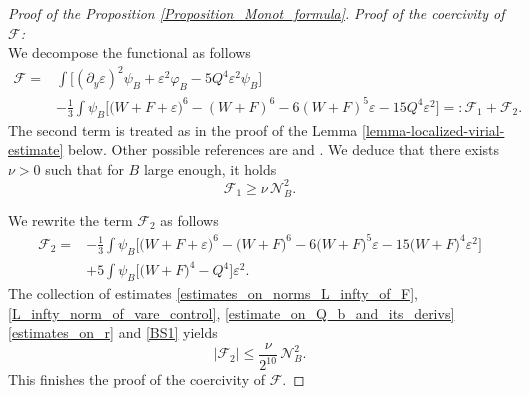 \documentclass[16pt,english, oneside,reqno]{smfart}
\newcommand{\vare}{{\varepsilon}}
\newcommand{\vphi}{{\varphi}}
\begin{document}
\begin{proof}[Proof of the Proposition \ref{Proposition_Monot_formula}]
\vspace{0.4cm}
\textit{Proof of the coercivity of $\mathcal{F}$:}\\
We decompose the functional as follows
\begin{equation}
    \begin{split}
        \mathcal{F} = 
        & \int \Big[ (\partial_y \vare)^2\psi_B +\vare^2 \vphi_B - 5Q^4 \vare^2\psi_B \Big]\\
        &-\frac{1}{3}\int \psi_B \Big[\big( W+F+\vare \big)^6 - (W+F)^6 - 6(W+F)^5\vare - 15Q^4\vare^2 \Big]
    =: \mathcal{F}_1 + \mathcal{F}_2.
    \end{split}
\end{equation}
The second term is treated as in the proof of the Lemma \ref{lemma-localized-virial-estimate} below. Other possible references are \cite[Appendix A]{Martel-Merle-02} and \cite[Lemma 3.5 ]{Combet-Martel-17}. We deduce that there exists $\nu>0$ such that for $B$ large enough, it holds
\begin{equation}
     \mathcal{F}_1 \geq \nu\, \mathcal{N}^2_B.
\end{equation}

We rewrite the term $\mathcal{F}_2$ as follows
\begin{equation}
    \begin{split}
        \mathcal{F}_2 = 
        & -\frac{1}{3}\int \psi_B \Big[ \big( W+F+\vare\big)^6 - \big( W+F\big)^6 - 6 \big( W+F\big)^5\vare - 15\big( W+F\big)^4\vare^2 \Big]\\
        & +5\int \psi_B\Big[\big( W+F \big)^4 - Q^4 \Big]\vare^2.
     \end{split}
\end{equation}
The collection of estimates \eqref{estimates_on_norms_L_infty_of_F}, \eqref{L_infty_norm_of_vare_control}, \eqref{estimate_on_Q_b_and_its_derivs} \eqref{estimates_on_r} and \eqref{BS1} yields
\begin{equation}
    \big| \mathcal{F}_2 \big| \leq \frac{\nu}{2^{10}}\,\mathcal{N}_B^2.
\end{equation}
This finishes the proof of the coercivity of $\mathcal{F}$.
\end{proof}
\end{document}

